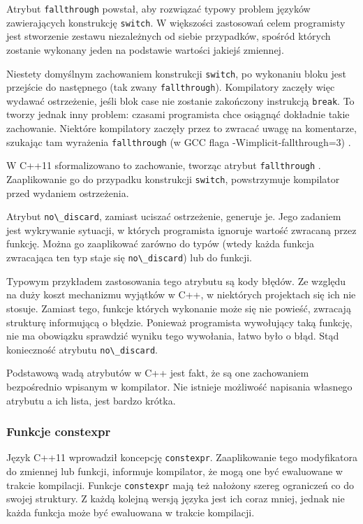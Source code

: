 Atrybut \lstinline{fallthrough} powstał, aby rozwiązać typowy problem języków zawierających konstrukcję \lstinline{switch}. W większości zastosowań celem programisty jest stworzenie zestawu niezależnych od siebie przypadków, spośród których zostanie wykonany jeden na podstawie wartości jakiejś zmiennej.\par
Niestety domyślnym zachowaniem konstrukcji \lstinline{switch}, po wykonaniu bloku jest przejście do następnego (tak zwany \lstinline{fallthrough}). Kompilatory zaczęły więc wydawać ostrzeżenie, jeśli blok case nie zostanie zakończony instrukcją \lstinline{break}. To tworzy jednak inny problem: czasami programista chce osiągnąć dokładnie takie zachowanie. Niektóre kompilatory zaczęły przez to zwracać uwagę na komentarze, szukając tam wyrażenia \lstinline{fallthrough} (w GCC flaga -Wimplicit-fallthrough=3) \cite{gcc_warnings}.\par
W C++11 sformalizowano to zachowanie, tworząc atrybut \lstinline{fallthrough} \cite{ISO:2012:III}. Zaaplikowanie go do przypadku konstrukcji \lstinline{switch}, powstrzymuje kompilator przed wydaniem ostrzeżenia.\par
Atrybut \lstinline{no\_discard}, zamiast uciszać ostrzeżenie, generuje je. Jego zadaniem jest wykrywanie sytuacji, w których programista ignoruje wartość zwracaną przez funkcję. Można go zaaplikować zarówno do typów (wtedy każda funkcja zwracająca ten typ staje się \lstinline{no\_discard}) lub do funkcji.\par
Typowym przykładem zastosowania tego atrybutu są kody błędów. Ze względu na duży koszt mechanizmu wyjątków w C++, w niektórych projektach się ich nie stosuje. Zamiast tego, funkcje których wykonanie może się nie powieść, zwracają strukturę informującą o błędzie. Ponieważ programista wywołujący taką funkcję, nie ma obowiązku sprawdzić wyniku tego wywołania, łatwo było o błąd. Stąd konieczność atrybutu \lstinline{no\_discard}.

Podstawową wadą atrybutów w C++ jest fakt, że są one zachowaniem bezpośrednio wpisanym w kompilator. Nie istnieje możliwość napisania własnego atrybutu a ich lista, jest bardzo krótka.\par
\subsubsection{Funkcje constexpr}
Język C++11 wprowadził koncepcję \lstinline{constexpr}. %
Zaaplikowanie tego modyfikatora do zmiennej lub funkcji, informuje kompilator, że mogą one być ewaluowane w trakcie kompilacji. Funkcje \lstinline{constexpr} mają też nałożony szereg ograniczeń co do swojej struktury. Z każdą kolejną wersją języka jest ich coraz mniej, jednak nie każda funkcja może być ewaluowana w trakcie kompilacji.

